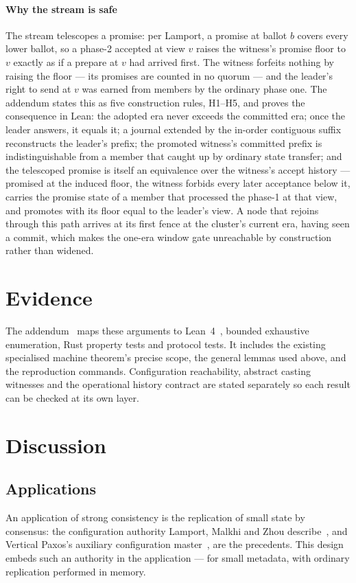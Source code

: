 \documentclass[10pt,journal,letterpaper]{IEEEtran}
\begin{document}
\paragraph{Why the stream is safe}
The stream telescopes a promise: per Lamport, a promise at ballot $b$
covers every lower ballot, so a phase-2 accepted at view $v$ raises the
witness's promise floor to $v$ exactly as if a prepare at $v$ had arrived
first. The witness forfeits nothing by raising the floor --- its promises
are counted in no quorum --- and the leader's right to send at $v$ was
earned from members by the ordinary phase one. The addendum states this
as five construction rules, H1--H5, and proves the consequence in Lean:
the adopted era never exceeds the committed era; once the leader answers,
it equals it; a journal extended by the in-order contiguous suffix
reconstructs the leader's prefix; the promoted witness's committed
prefix is indistinguishable from a member that caught up by ordinary state
transfer; and the telescoped promise is itself an equivalence over the
witness's accept history --- promised at the induced floor, the witness
forbids every later acceptance below it, carries the promise state of a
member that processed the phase-1 at that view, and promotes with its
floor equal to the leader's view. A node that rejoins through this path arrives at its first fence
at the cluster's current era, having seen a commit, which makes the
one-era window gate unreachable by construction rather than widened.

\section{Evidence}\label{sec:evidence}
The addendum~\cite{artifact} maps these arguments to Lean~4~\cite{lean4}, bounded exhaustive enumeration, Rust property tests and protocol tests. It includes the existing specialised machine theorem's precise scope, the general lemmas used above, and the reproduction commands. Configuration reachability, abstract casting witnesses and the operational history contract are stated separately so each result can be checked at its own layer.

\section{Discussion}\label{sec:discussion}
\subsection{Applications}
An application of strong consistency is the replication of small state by
consensus: the configuration authority Lamport, Malkhi and Zhou
describe~\cite{reconfig-sm}, and Vertical Paxos's auxiliary configuration
master~\cite{vertical-paxos}, are the precedents. This design embeds such an
authority in the application --- for small metadata, with ordinary replication
performed in memory.
\end{document}
